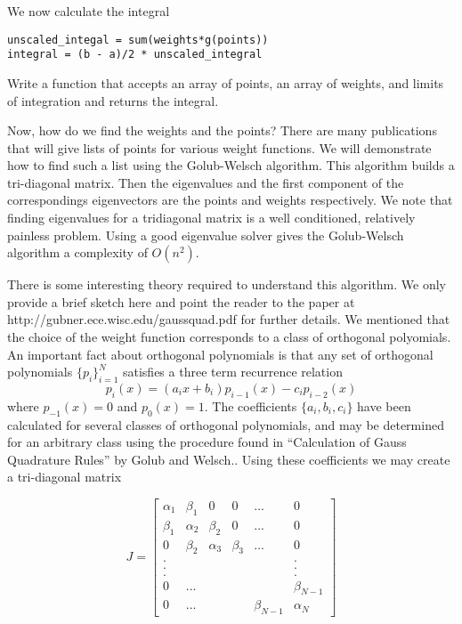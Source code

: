 We now calculate the integral

\begin{lstlisting}
unscaled_integal = sum(weights*g(points))
integral = (b - a)/2 * unscaled_integral
\end{lstlisting}

\begin{problem}

Write a function that accepts an array of points, an array of weights, and limits of integration and returns the integral.

\end{problem}

Now, how do we find the weights and the points?  There are many publications that will give lists of points for various weight functions.  We will demonstrate how to find such a list using the Golub-Welsch algorithm.  This algorithm builds a tri-diagonal matrix.  Then the eigenvalues and the first component of the correspondings eigenvectors are the points and weights respectively.  We note that finding eigenvalues for a tridiagonal matrix is a well conditioned, relatively painless problem.  Using a good eigenvalue solver gives the Golub-Welsch algorithm a complexity of $O(n^2)$.

There is some interesting theory required to understand this algorithm.  We only provide a brief sketch here and point the reader to the paper at http://gubner.ece.wisc.edu/gaussquad.pdf for further details.  We mentioned that the choice of the weight function corresponds to a class of orthogonal polyomials.  An important fact about orthogonal polynomials is that any set of orthogonal polynomials $\{p_i\}_{i=1}^N$ satisfies a three term recurrence relation
\[
p_i(x) = (a_ix + b_i)p_{i-1}(x) - c_ip_{i-2}(x)
\]
where $p_{-1}(x) = 0$ and $p_0(x) = 1$.  The coefficients $\{a_i, b_i, c_i\}$ have been calculated for several classes of orthogonal polynomials, and may be determined for an arbitrary class using the procedure found in ``Calculation of Gauss Quadrature Rules'' by Golub and Welsch..  Using these coefficients we may create a tri-diagonal matrix

\[
J = \begin{bmatrix}

\alpha_1 & \beta_1 & 0 & 0 & ... & 0 \\
\beta_1 & \alpha_2 & \beta_2 & 0 & ... & 0 \\
0 & \beta_2 & \alpha_3 & \beta_3 & ... & 0 \\
. & & & & & . \\
. & & & & & . \\
. & & & & & . \\
0 & ... & & & & \beta_{N-1} \\
0 & ... & & & \beta_{N-1} & \alpha_N

\end{bmatrix}
\]

